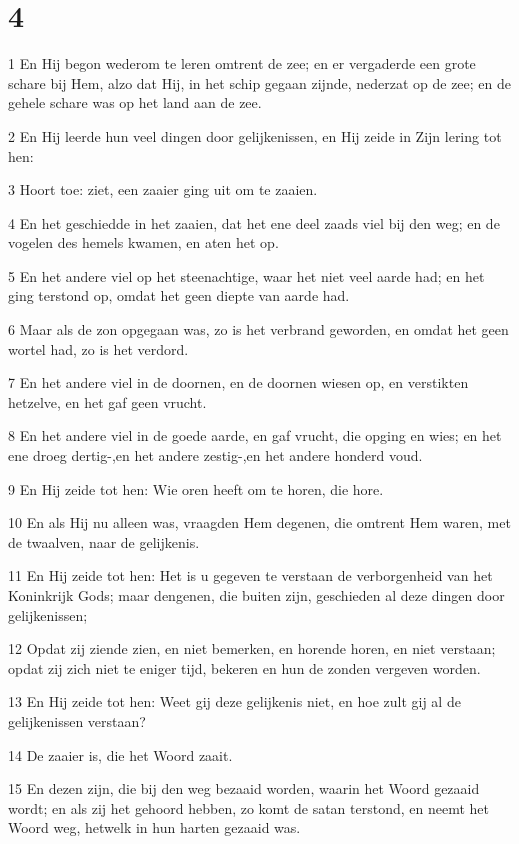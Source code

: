 \chapter{4}

\par 1 En Hij begon wederom te leren omtrent de zee; en er vergaderde een grote schare bij Hem, alzo dat Hij, in het schip gegaan zijnde, nederzat op de zee; en de gehele schare was op het land aan de zee.
\par 2 En Hij leerde hun veel dingen door gelijkenissen, en Hij zeide in Zijn lering tot hen:
\par 3 Hoort toe: ziet, een zaaier ging uit om te zaaien.
\par 4 En het geschiedde in het zaaien, dat het ene deel zaads viel bij den weg; en de vogelen des hemels kwamen, en aten het op.
\par 5 En het andere viel op het steenachtige, waar het niet veel aarde had; en het ging terstond op, omdat het geen diepte van aarde had.
\par 6 Maar als de zon opgegaan was, zo is het verbrand geworden, en omdat het geen wortel had, zo is het verdord.
\par 7 En het andere viel in de doornen, en de doornen wiesen op, en verstikten hetzelve, en het gaf geen vrucht.
\par 8 En het andere viel in de goede aarde, en gaf vrucht, die opging en wies; en het ene droeg dertig-,en het andere zestig-,en het andere honderd voud.
\par 9 En Hij zeide tot hen: Wie oren heeft om te horen, die hore.
\par 10 En als Hij nu alleen was, vraagden Hem degenen, die omtrent Hem waren, met de twaalven, naar de gelijkenis.
\par 11 En Hij zeide tot hen: Het is u gegeven te verstaan de verborgenheid van het Koninkrijk Gods; maar dengenen, die buiten zijn, geschieden al deze dingen door gelijkenissen;
\par 12 Opdat zij ziende zien, en niet bemerken, en horende horen, en niet verstaan; opdat zij zich niet te eniger tijd, bekeren en hun de zonden vergeven worden.
\par 13 En Hij zeide tot hen: Weet gij deze gelijkenis niet, en hoe zult gij al de gelijkenissen verstaan?
\par 14 De zaaier is, die het Woord zaait.
\par 15 En dezen zijn, die bij den weg bezaaid worden, waarin het Woord gezaaid wordt; en als zij het gehoord hebben, zo komt de satan terstond, en neemt het Woord weg, hetwelk in hun harten gezaaid was.
